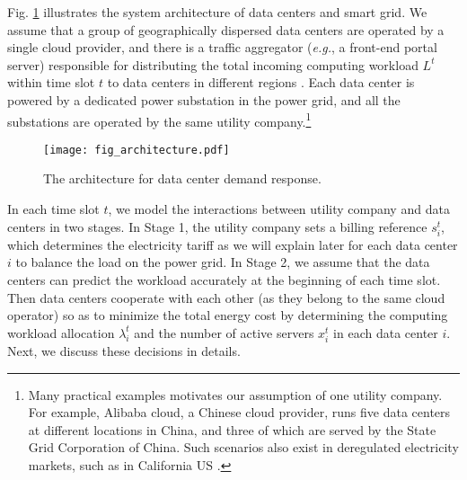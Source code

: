 \documentclass[journal]{IEEEtran}
\begin{document}
	Fig. \ref{fig_architecture} illustrates the system architecture of data centers and smart grid. We assume that a group of geographically dispersed data centers are operated by a single cloud provider, and there is a traffic aggregator (\emph{e.g.}, a front-end portal server) responsible for distributing the total incoming computing workload $L^{t}$ within time slot $t$ to data centers in different regions \cite{infocom}. Each data center is powered by a dedicated power substation in the power grid, and all the substations are operated by the same utility company.\footnote{Many practical examples motivates our assumption of one utility company. For example, Alibaba cloud, a Chinese cloud provider, runs five data centers at different locations in China, and three of which are served by the State Grid Corporation of China. Such scenarios also exist in deregulated electricity markets, such as in California US \cite{California}.}
	\begin{figure}[t]
		\centering
		\texttt{[image: fig\_architecture.pdf]}
		\caption{\label{fig_architecture}The architecture for data center demand response.}
\end{figure}
	In each time slot $t$, we model the interactions between utility company and data centers in two stages. In Stage 1, the utility company sets a billing reference $s_{i}^{t}$, which determines the electricity tariff as we will explain later for each data center $i$ to balance the load on the power grid. In Stage 2, we assume that the data centers can predict the workload accurately at the beginning of each time slot. Then data centers cooperate with each other (as they belong to the same cloud operator) so as to minimize the total energy cost by determining the computing workload allocation $\lambda_{i}^{t}$ and the number of active servers $x_{i}^{t}$ in each data center $i$. Next, we discuss these decisions in details.
	
\end{document}
